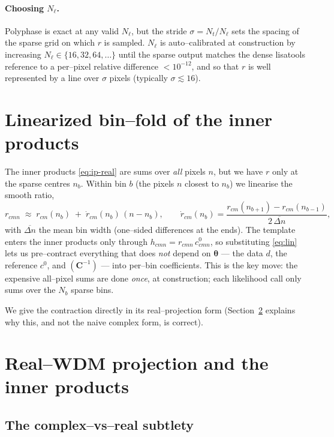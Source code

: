 \documentclass[11pt]{article}
\newcommand{\Nt}{N_t}
\newcommand{\Ntl}{N_\ell}
\newcommand{\invC}{(\bm{C}^{-1})}
\begin{document}
\paragraph{Choosing $\Ntl$.} Polyphase is exact at any valid $\Ntl$, but the
stride $\sigma=\Nt/\Ntl$ sets the spacing of the sparse grid on which $r$ is
sampled. $\Ntl$ is auto--calibrated at construction by increasing
$\Ntl\in\{16,32,64,\dots\}$ until the sparse output matches the dense lisatools
reference to a per--pixel relative difference $<10^{-12}$, and so that $r$ is
well represented by a line over $\sigma$ pixels (typically $\sigma\lesssim16$).

\section{Linearized bin--fold of the inner products}
\label{sec:binfold}

The inner products \eqref{eq:ip-real} are sums over \emph{all} pixels $n$, but we
have $r$ only at the sparse centres $n_b$. Within bin $b$ (the pixels $n$ closest
to $n_b$) we linearise the smooth ratio,
\begin{equation}
r_{cmn} \;\approx\; r_{cm}(n_b) \;+\; \dot r_{cm}(n_b)\,(n-n_b),
\qquad
\dot r_{cm}(n_b) = \frac{r_{cm}(n_{b+1})-r_{cm}(n_{b-1})}{2\,\overline{\Delta n}},
\label{eq:lin}
\end{equation}
with $\overline{\Delta n}$ the mean bin width (one--sided differences at the
ends). The template enters the inner products only through $h_{cmn}=r_{cmn}\,
c^0_{cmn}$, so substituting \eqref{eq:lin} lets us pre--contract everything that
does \emph{not} depend on $\bm\theta$ --- the data $d$, the reference $c^0$, and
$\invC$ --- into per--bin coefficients. This is the key move: the expensive
all--pixel sums are done \emph{once}, at construction; each likelihood call only
sums over the $N_b$ sparse bins.

We give the contraction directly in its real--projection form
(Section~\ref{sec:realproj} explains why this, and not the naive complex form, is
correct).

\section{Real--WDM projection and the inner products}
\label{sec:realproj}

\subsection{The complex--vs--real subtlety}
\end{document}
